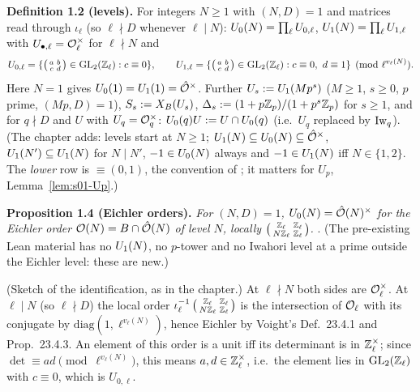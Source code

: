 \medskip
\noindent{}\label{rpt:def:s01-levels}\textbf{Definition 1.2 (levels).}
For integers $N\ge1$ with $(N,D)=1$ and matrices read through $\iota_\ell$ (so $\ell\nmid D$ whenever $\ell\mid N$):
$U_0(N)=\prod_\ell U_{0,\ell}$, $U_1(N)=\prod_\ell U_{1,\ell}$ with $U_{\bullet,\ell}=\mathcal{O}_\ell^\times$ for $\ell\nmid N$ and
\[U_{0,\ell}=\{\left(\begin{smallmatrix}a&b\\c&d\end{smallmatrix}\right)\in\GL_2(\Z_\ell):c\equiv0\},\qquad
U_{1,\ell}=\{\left(\begin{smallmatrix}a&b\\c&d\end{smallmatrix}\right)\in\GL_2(\Z_\ell):c\equiv0,\ d\equiv1\}\pmod{\ell^{v_\ell(N)}}.\]
Here $N=1$ gives $U_0(1)=U_1(1)=\hat{\mathcal{O}}^\times$. Further $U_s:=U_1(Mp^s)$ ($M\ge1$, $s\ge0$, $p$ prime, $(Mp,D)=1$), $S_s:=X_B(U_s)$,
$\Delta_s:=(1+p\mathbb{Z}_p)/(1+p^s\mathbb{Z}_p)$ for $s\ge1$, and for $q\nmid D$ and $U$ with $U_q=\mathcal{O}_q^\times$: $U_0(q)U:=U\cap U_0(q)$ (i.e.\ $U_q$
replaced by $\mathrm{Iw}_q$).
(The chapter adds: levels start at $N\ge1$; $U_1(N)\subseteq U_0(N)\subseteq\hat{\mathcal{O}}^\times$, $U_1(N')\subseteq U_1(N)$ for $N\mid N'$,
$-1\in U_0(N)$ always and $-1\in U_1(N)$ iff $N\in\{1,2\}$. The \emph{lower} row is $\equiv(0,1)$, the convention of
\cite[\S4, p.~10]{Buz04}; it matters for $U_p$, Lemma~\ref{lem:s01-Up}.)

\medskip
\noindent{}\label{rpt:prop:s01-eichler}\textbf{Proposition 1.4 (Eichler orders).}
\emph{For $(N,D)=1$, $U_0(N)=\hat{\mathcal{O}}(N)^\times$ for the Eichler order $\mathcal{O}(N)=B\cap\hat{\mathcal{O}}(N)$ of level $N$, locally
$\left(\begin{smallmatrix}\mathbb{Z}_\ell&\mathbb{Z}_\ell\\N\mathbb{Z}_\ell&\mathbb{Z}_\ell\end{smallmatrix}\right)$.} \stknown{}
\cite[Def.~23.4.1 and Prop.~23.4.3, p.~382]{Vo}.
(The pre-existing Lean material has no $U_1(N)$, no $p$-tower and no Iwahori level at a prime outside the Eichler level: these are new.)
\begin{outline}
(Sketch of the identification, as in the chapter.) At $\ell\nmid N$ both sides are $\mathcal{O}_\ell^\times$. At $\ell\mid N$ (so $\ell\nmid D$) the
local order $\iota_\ell^{-1}\left(\begin{smallmatrix}\mathbb{Z}_\ell&\mathbb{Z}_\ell\\N\mathbb{Z}_\ell&\mathbb{Z}_\ell\end{smallmatrix}\right)$ is the intersection of
$\mathcal{O}_\ell$ with its conjugate by $\mathrm{diag}(1,\ell^{v_\ell(N)})$, hence Eichler by Voight's Def.~23.4.1 and Prop.~23.4.3. An element of
this order is a unit iff its determinant is in $\mathbb{Z}_\ell^\times$; since $\det\equiv ad\pmod{\ell^{v_\ell(N)}}$, this means $a,d\in\mathbb{Z}_\ell^\times$,
i.e.\ the element lies in $\mathrm{GL}_2(\mathbb{Z}_\ell)$ with $c\equiv0$, which is $U_{0,\ell}$.
\end{outline}

